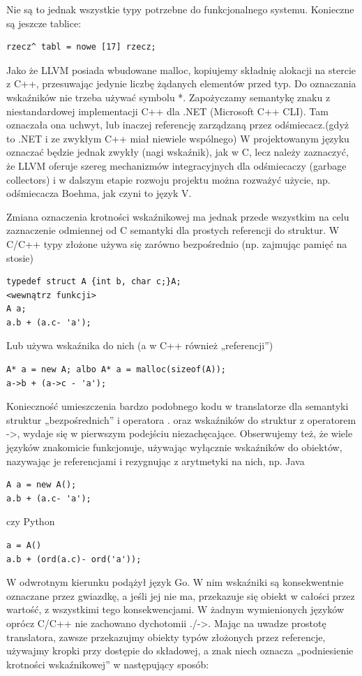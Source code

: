 Nie są to jednak wszystkie typy potrzebne do funkcjonalnego systemu. Konieczne są jeszcze tablice:
\begin{lstlisting}
rzecz^ tabl = nowe [17] rzecz;
\end{lstlisting}
Jako że LLVM posiada wbudowane malloc, kopiujemy składnię alokacji na stercie z C++, przesuwając jedynie liczbę żądanych elementów przed typ.
Do oznaczania wskaźników nie trzeba używać symbolu *. Zapożyczamy semantykę znaku \up\space z niestandardowej implementacji C++ dla .NET (Microsoft C++ CLI). Tam oznaczała ona uchwyt, lub inaczej referencję zarządzaną przez odśmiecacz.(gdyż to .NET i ze zwykłym C++ miał niewiele wspólnego) W projektowanym języku oznaczać będzie jednak \up \space zwykły (nagi wskaźnik), jak w C, lecz należy zaznaczyć, że LLVM oferuje szereg mechanizmów integracyjnych dla odśmiecaczy (garbage collectors) i w dalszym etapie rozwoju projektu można rozważyć użycie, np. odśmiecacza Boehma, jak czyni to język V.\cite{vlang_repo}

Zmiana oznaczenia krotności wskaźnikowej ma jednak przede wszystkim na celu zaznaczenie odmiennej od C semantyki dla prostych referencji do struktur. W C/C++ typy złożone używa się zarówno bezpośrednio (np. zajmując pamięć na stosie)
\begin{lstlisting}
typedef struct A {int b, char c;}A;
<wewnątrz funkcji>
A a;
a.b + (a.c- 'a');
\end{lstlisting}
Lub używa wskaźnika do nich (a w C++ również „referencji”)
\begin{lstlisting}
A* a = new A; albo A* a = malloc(sizeof(A));
a->b + (a->c - 'a');
\end{lstlisting}
Konieczność umieszczenia bardzo podobnego kodu w translatorze dla semantyki struktur „bezpośrednich” i operatora . oraz wskaźników do struktur z operatorem ->, wydaje się w pierwszym podejściu niezachęcające. Obserwujemy też, że wiele języków znakomicie funkcjonuje, używając wyłącznie wskaźników do obiektów, nazywając je referencjami i rezygnując z arytmetyki na nich, np. Java
\begin{lstlisting}
A a = new A(); 
a.b + (a.c- 'a');
\end{lstlisting}
czy Python
\begin{lstlisting}
a = A() 
a.b + (ord(a.c)- ord('a'));
\end{lstlisting}
W odwrotnym kierunku podążył język Go. W nim wskaźniki są konsekwentnie oznaczane przez gwiazdkę, a jeśli jej nie ma, przekazuje się obiekt w całości przez wartość, z wszystkimi tego konsekwencjami.
W żadnym wymienionych języków oprócz C/C++ nie zachowano dychotomii ./->.
Mając na uwadze prostotę translatora, zawsze przekazujmy obiekty typów złożonych przez referencje, używajmy kropki przy dostępie do składowej, a znak \up\space niech oznacza „podniesienie krotności wskaźnikowej” w następujący sposób:

